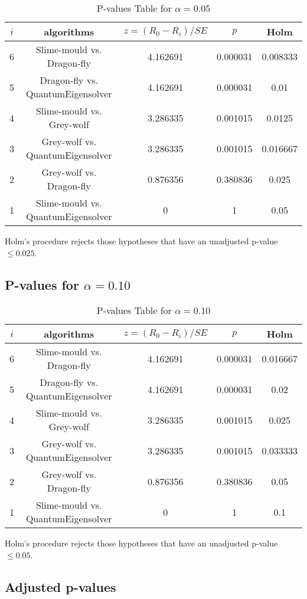 \documentclass[a4paper,10pt]{article}
\begin{document}
\begin{landscape}
\begin{table}[!htp]
\centering\scriptsize
\begin{tabular}{ccccc}
$i$&algorithms&$z=(R_0 - R_i)/SE$&$p$&Holm\\
\hline6&Slime-mould vs. Dragon-fly&4.162691&0.000031&0.008333\\
5&Dragon-fly vs. QuantumEigensolver&4.162691&0.000031&0.01\\
4&Slime-mould vs. Grey-wolf&3.286335&0.001015&0.0125\\
3&Grey-wolf vs. QuantumEigensolver&3.286335&0.001015&0.016667\\
2&Grey-wolf vs. Dragon-fly&0.876356&0.380836&0.025\\
1&Slime-mould vs. QuantumEigensolver&0&1&0.05\\
\hline
\end{tabular}
\caption{P-values Table for $\alpha=0.05$}
\end{table}Holm's procedure rejects those hypotheses that have an unadjusted p-value $\le0.025$.

\pagebreak

\subsection{P-values for $\alpha=0.10$}

\begin{table}[!htp]
\centering\scriptsize
\begin{tabular}{ccccc}
$i$&algorithms&$z=(R_0 - R_i)/SE$&$p$&Holm\\
\hline6&Slime-mould vs. Dragon-fly&4.162691&0.000031&0.016667\\
5&Dragon-fly vs. QuantumEigensolver&4.162691&0.000031&0.02\\
4&Slime-mould vs. Grey-wolf&3.286335&0.001015&0.025\\
3&Grey-wolf vs. QuantumEigensolver&3.286335&0.001015&0.033333\\
2&Grey-wolf vs. Dragon-fly&0.876356&0.380836&0.05\\
1&Slime-mould vs. QuantumEigensolver&0&1&0.1\\
\hline
\end{tabular}
\caption{P-values Table for $\alpha=0.10$}
\end{table}Holm's procedure rejects those hypotheses that have an unadjusted p-value $\le0.05$.

\pagebreak

\subsection{Adjusted p-values}


\end{landscape}
\end{document}
